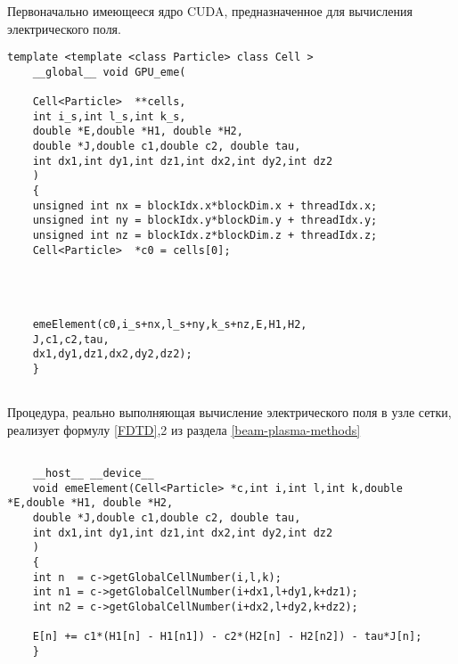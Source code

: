 \begin{ListingEnv}[!h]
	\captiondelim{ } %
\caption{Первоначально имеющееся ядро CUDA, предназначенное для вычисления электрического поля.}
\label{Original-function}	
	\begin{lstlisting}[language={[ISO]C++}]
	template <template <class Particle> class Cell >
	__global__ void GPU_eme(
	
	Cell<Particle>  **cells,
	int i_s,int l_s,int k_s,
	double *E,double *H1, double *H2,
	double *J,double c1,double c2, double tau,
	int dx1,int dy1,int dz1,int dx2,int dy2,int dz2
	)
	{
	unsigned int nx = blockIdx.x*blockDim.x + threadIdx.x;
	unsigned int ny = blockIdx.y*blockDim.y + threadIdx.y;
	unsigned int nz = blockIdx.z*blockDim.z + threadIdx.z;
	Cell<Particle>  *c0 = cells[0];
	
	
	
	
	emeElement(c0,i_s+nx,l_s+ny,k_s+nz,E,H1,H2,
	J,c1,c2,tau,
	dx1,dy1,dz1,dx2,dy2,dz2);
	}
	
	\end{lstlisting}
	\label{listing-GPU-plasma-class}
\end{ListingEnv}

\begin{ListingEnv}[!h]
	\captiondelim{ } %
	\caption{Процедура, реально выполняющая вычисление электрического поля в узле сетки, реализует формулу \ref{FDTD},2 из раздела \ref{beam-plasma-methods}}
	\label{listing-real-computer}	
	\begin{lstlisting}[language={[ISO]C++}]

	__host__ __device__                                                                                                    
	void emeElement(Cell<Particle> *c,int i,int l,int k,double *E,double *H1, double *H2,                          
	double *J,double c1,double c2, double tau,                                                     
	int dx1,int dy1,int dz1,int dx2,int dy2,int dz2                                                
	)                                                                                              
	{                                                                                                              
	int n  = c->getGlobalCellNumber(i,l,k);                                                                     
	int n1 = c->getGlobalCellNumber(i+dx1,l+dy1,k+dz1);                                                          
	int n2 = c->getGlobalCellNumber(i+dx2,l+dy2,k+dz2);                                                          
	
	E[n] += c1*(H1[n] - H1[n1]) - c2*(H2[n] - H2[n2]) - tau*J[n];                                                
	}   
	\end{lstlisting}
\end{ListingEnv}





